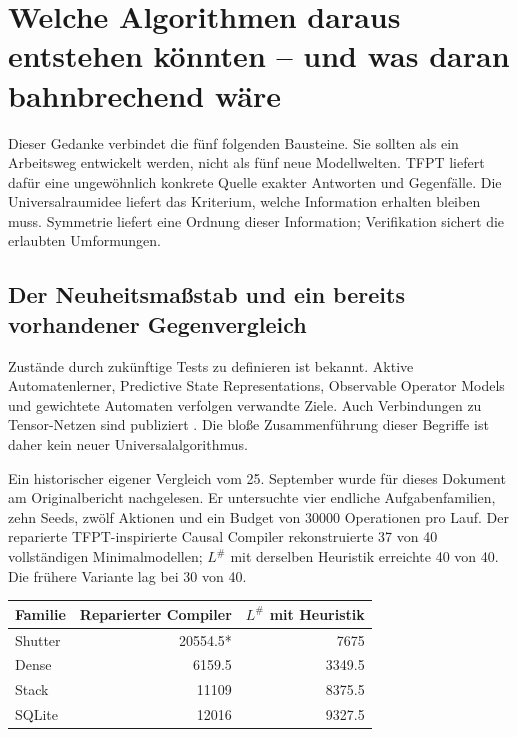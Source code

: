 \section{Welche Algorithmen daraus entstehen könnten -- und was daran bahnbrechend wäre}\label{sec:algorithms}


Dieser Gedanke verbindet die fünf folgenden Bausteine. Sie sollten als ein Arbeitsweg entwickelt werden, nicht als fünf neue Modellwelten. TFPT liefert dafür eine ungewöhnlich konkrete Quelle exakter Antworten und Gegenfälle. Die Universalraumidee liefert das Kriterium, welche Information erhalten bleiben muss. Symmetrie liefert eine Ordnung dieser Information; Verifikation sichert die erlaubten Umformungen.

\subsection{Der Neuheitsmaßstab und ein bereits vorhandener Gegenvergleich}
Zustände durch zukünftige Tests zu definieren ist bekannt. Aktive Automatenlerner, Predictive State Representations, Observable Operator Models und gewichtete Automaten verfolgen verwandte Ziele. Auch Verbindungen zu Tensor-Netzen sind publiziert \cite{littman,thon,adhikary,lsharp}. Die bloße Zusammenführung dieser Begriffe ist daher kein neuer Universalalgorithmus.

Ein historischer eigener Vergleich vom 25. September wurde für dieses Dokument am Originalbericht nachgelesen. Er untersuchte vier endliche Aufgabenfamilien, zehn Seeds, zwölf Aktionen und ein Budget von 30000 Operationen pro Lauf. Der reparierte TFPT-inspirierte Causal Compiler rekonstruierte 37 von 40 vollständigen Minimalmodellen; $L^\#$ mit derselben Heuristik erreichte 40 von 40. Die frühere Variante lag bei 30 von 40.

\begin{center}
\begin{tabular}{lrr}
\toprule
Familie & Reparierter Compiler & $L^{\#}$ mit Heuristik\\\midrule
Shutter & 20554.5* & 7675\\
Dense & 6159.5 & 3349.5\\
Stack & 11109 & 8375.5\\
SQLite & 12016 & 9327.5\\\bottomrule
\end{tabular}
\end{center}

